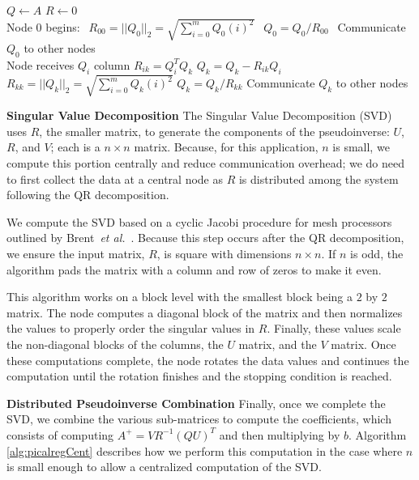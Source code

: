 \documentclass[prodmode,acmtosn]{acmsmall}
\newcommand\etal{\emph{et al.}}
\begin{document}
\begin{algorithm}
\caption{QR Decomposition}\label{alg:qr}
\begin{algorithmic}
\State $Q \gets A$
\State $R \gets 0$\\

\State Node 0 begins:
\State $ \ \ R_{00}=||Q_0||_2=\sqrt{\sum_{i=0}^{m}{Q_0(i)^2}}$
\State $ \ \ Q_0=Q_0/R_{00}$
\State $ \ \ $Communicate $Q_0$ to other nodes \\

\State Node receives $Q_i$ column
\State $R_{ik} = Q_i^TQ_k$
\State $Q_k=Q_k-R_{ik}Q_i$
\State $R_{kk}=||Q_k||_2=\sqrt{\sum_{i=0}^{m}{Q_k(i)^2}}$
\State $Q_k=Q_k/R_{kk}$
\State Communicate $Q_k$ to other nodes
\EndIf
\EndFor
\EndFor
\end{algorithmic}
\end{algorithm}

{\bf Singular Value Decomposition}\newline
The Singular Value Decomposition (SVD) uses $R$, the smaller matrix, to generate the components of the pseudoinverse: $U$, $R$, and $V$; each is a $n \times n$ matrix.
Because, for this application, $n$ is small, we compute this portion centrally and reduce communication overhead; we do need to first collect the data at a central node as $R$ is distributed among the system following the QR decomposition.

We compute the SVD based on a cyclic Jacobi procedure for mesh processors outlined by Brent~\etal~\cite{brentJVCS1985}.
Because this step occurs after the QR decomposition, we ensure the input matrix, $R$, is square with dimensions $n \times n$.
If $n$ is odd, the algorithm pads the matrix with a column and row of zeros to make it even.

This algorithm works on a block level with the smallest block being a $2$ by $2$ matrix.
The node computes a diagonal block of the matrix and then normalizes the values to properly order the singular values in $R$.
Finally, these values scale the non-diagonal blocks of the columns, the $U$ matrix, and the $V$ matrix.
Once these computations complete, the node rotates the data values and continues the computation until the rotation finishes and the stopping condition is reached.

{\bf Distributed Pseudoinverse Combination}\newline
Finally, once we complete the SVD, we combine the various sub-matrices to compute the coefficients, which consists of computing $A^+=VR^{-1}(QU)^T$ and then multiplying by $b$.
Algorithm \ref{alg:picalregCent} describes how we perform this computation in the case where $n$ is small enough to allow a centralized computation of the SVD.
\end{document}
